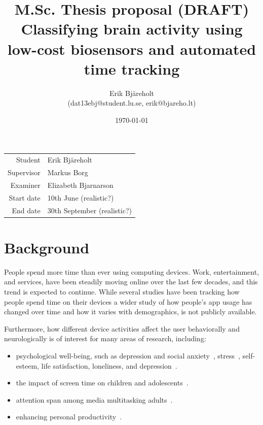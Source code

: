 \documentclass{IEEEtran}
\title{%
    \large M.Sc. Thesis proposal (DRAFT)\\
    \huge Classifying brain activity using low-cost biosensors and automated time tracking \\}
\author{Erik Bjäreholt \\(dat13ebj@student.lu.se, erik@bjareho.lt)}
\date{\today}
\begin{document}
\maketitle

\begin{center}
\begin{tabular}{r l}
 Student & Erik Bjäreholt \\
 Supervisor & Markus Borg \\
 Examiner & Elizabeth Bjarnarson \\
 Start date & 10th June (realistic?) \\
 End date & 30th September (realistic?) \\
\end{tabular}
\end{center}

\tableofcontents


\section{Background}

People spend more time than ever using computing devices. Work, entertainment, and services, have been steadily moving online over the last few decades, and this trend is expected to continue. While several studies have been tracking how people spend time on their devices a wider study of how people's app usage has changed over time and how it varies with demographics, is not publicly available.

Furthermore, how different device activities affect the user behaviorally and neurologically is of interest for many areas of research, including:

\begin{itemize}
    \item psychological well-being, such as depression and social anxiety~\cite{selfhout_different_2009}\cite{shah_nonrecursive_2002}, stress~\cite{mark_stress_2014}, self-esteem, life satisfaction, loneliness, and depression~\cite{huang_time_2017}.
    \item the impact of screen time on children and adolescents~\cite{subrahmanyam_impact_2001}.
    \item attention span among media multitasking adults~\cite{mark_stress_2014}.
    \item enhancing personal productivity~\cite{kim_timeaware_2016}.
\end{itemize}
\end{document}
